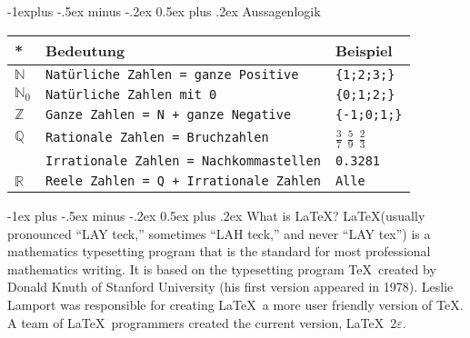 \documentclass[10pt,landscape]{article}
\makeatletter
\renewcommand{\section}{\@startsection{section}{1}{0mm}%
                                {-1ex plus -.5ex minus -.2ex}%
                                {0.5ex plus .2ex}%
                                {\normalfont\large\bfseries}}
\renewcommand{\subsection}{\@startsection{subsection}{2}{0mm}%
                                {-1explus -.5ex minus -.2ex}%
                                {0.5ex plus .2ex}%
                                {\normalfont\normalsize\bfseries}}
\makeatother
\begin{document}
\begin{multicols}{3}

    \subsection{Aussagenlogik}
    \begin{tabular}{l|l|l}
        \textbf{*}         & \textbf{Bedeutung}                           & \textbf{Beispiel}                            \\ \hline
        $\mathbb{N}$       & \verb!Natürliche Zahlen = ganze Positive!    & \verb!{1;2;3;}!                              \\
        ${\mathbb{N}}_{0}$ & \verb!Natürliche Zahlen mit 0!               & \verb!{0;1;2;}!                              \\
        $\mathbb{Z}$       & \verb!Ganze Zahlen = N + ganze Negative!     & \verb!{-1;0;1;}!                             \\
        $\mathbb{Q}$       & \verb!Rationale Zahlen = Bruchzahlen!        & $\frac{3}{7} $ $\frac{5}{9} $ $\frac{2}{3} $ \\
        \verb!!            & \verb!Irrationale Zahlen = Nachkommastellen! & \verb!0.3281!                                \\
        $\mathbb{R}$       & \verb!Reele Zahlen = Q + Irrationale Zahlen! & \verb!Alle!                                  \\
    \end{tabular}
    \section{What is \LaTeX?}
    \LaTeX (usually pronounced ``LAY teck,'' sometimes ``LAH teck,'' and never ``LAY tex'') is a mathematics typesetting program that is the standard for most professional mathematics writing. It is based on the typesetting program \TeX\ created by Donald Knuth of Stanford University (his first version appeared in 1978). Leslie Lamport was responsible for creating \LaTeX\, a more user friendly version of \TeX. A team of \LaTeX\ programmers created the current version,  \LaTeX\ 2$\varepsilon$.


\end{multicols}
\end{document}
